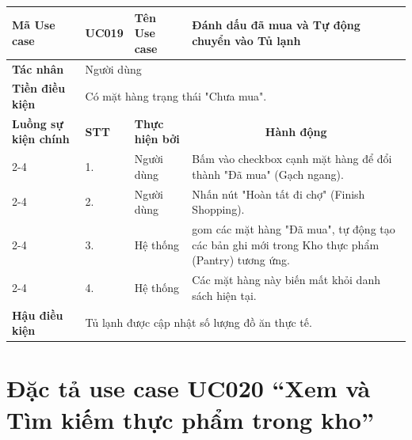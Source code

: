 \begin{longtable}{|p{2.7cm}|p{0.8cm}|p{2.6cm}|p{7.3cm}|}
\hline
\cellcolor[HTML]{D5F5E3}\textbf{Mã Use case} & \multicolumn{1}{l|}{UC019} & \cellcolor[HTML]{D5F5E3}\textbf{Tên Use case} & Đánh dấu đã mua và Tự động chuyển vào Tủ lạnh \\ \hline
\cellcolor[HTML]{D5F5E3}\textbf{Tác nhân} & \multicolumn{3}{p{10.7cm}|}{Người dùng} \\ \hline
\cellcolor[HTML]{D5F5E3}\textbf{Tiền điều kiện} & \multicolumn{3}{p{10.7cm}|}{Có mặt hàng trạng thái "Chưa mua".} \\ \hline

\cellcolor[HTML]{D5F5E3}\textbf{Luồng sự kiện chính} & \cellcolor[HTML]{FDEBD0}\textbf{STT} & \cellcolor[HTML]{FDEBD0}\textbf{Thực hiện bởi} & \multicolumn{1}{c|}{\cellcolor[HTML]{FDEBD0}\textbf{Hành động}} \\ \cline{2-4} 
\cellcolor[HTML]{D5F5E3} & 1. & Người dùng & Bấm vào checkbox cạnh mặt hàng để đổi thành "Đã mua" (Gạch ngang). \\ \cline{2-4} 
\cellcolor[HTML]{D5F5E3} & 2. & Người dùng & Nhấn nút "Hoàn tất đi chợ" (Finish Shopping). \\ \cline{2-4} 
\cellcolor[HTML]{D5F5E3} & 3. & Hệ thống & gom các mặt hàng "Đã mua", tự động tạo các bản ghi mới trong Kho thực phẩm (Pantry) tương ứng. \\ \cline{2-4} 
\cellcolor[HTML]{D5F5E3} & 4. & Hệ thống & Các mặt hàng này biến mất khỏi danh sách hiện tại. \\ \hline

\cellcolor[HTML]{D5F5E3}\textbf{Hậu điều kiện} & \multicolumn{3}{p{10.7cm}|}{Tủ lạnh được cập nhật số lượng đồ ăn thực tế.} \\ \hline
\end{longtable}
\endgroup

\section{Đặc tả use case UC020 ``Xem và Tìm kiếm thực phẩm trong kho''}
\vspace{0.5cm}

\begingroup
\renewcommand{\arraystretch}{1.5}


